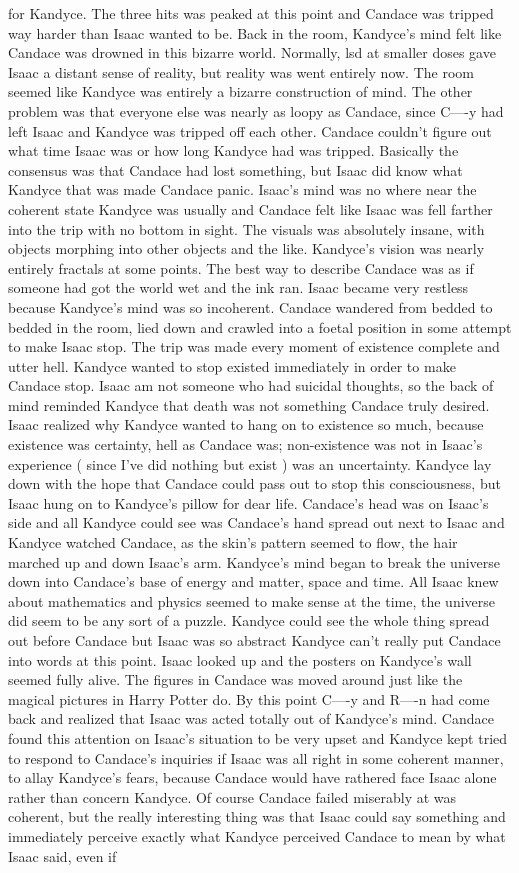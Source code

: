 \documentclass[12pt]{book}
\begin{document}
for Kandyce. The three hits was peaked at this point and Candace was tripped way harder than Isaac wanted to be. Back in the room, Kandyce's mind felt like Candace was drowned in this bizarre world. Normally, lsd at smaller doses gave Isaac a distant sense of reality, but reality was went entirely now. The room seemed like Kandyce was entirely a bizarre construction of mind. The other problem was that everyone else was nearly as loopy as Candace, since C----y had left Isaac and Kandyce was tripped off each other. Candace couldn't figure out what time Isaac was or how long Kandyce had was tripped. Basically the consensus was that Candace had lost something, but Isaac did know what Kandyce that was made Candace panic. Isaac's mind was no where near the coherent state Kandyce was usually and Candace felt like Isaac was fell farther into the trip with no bottom in sight. The visuals was absolutely insane, with objects morphing into other objects and the like. Kandyce's vision was nearly entirely fractals at some points. The best way to describe Candace was as if someone had got the world wet and the ink ran. Isaac became very restless because Kandyce's mind was so incoherent. Candace wandered from bedded to bedded in the room, lied down and crawled into a foetal position in some attempt to make Isaac stop. The trip was made every moment of existence complete and utter hell. Kandyce wanted to stop existed immediately in order to make Candace stop. Isaac am not someone who had suicidal thoughts, so the back of mind reminded Kandyce that death was not something Candace truly desired. Isaac realized why Kandyce wanted to hang on to existence so much, because existence was certainty, hell as Candace was; non-existence was not in Isaac's experience ( since I've did nothing but exist ) was an uncertainty. Kandyce lay down with the hope that Candace could pass out to stop this consciousness, but Isaac hung on to Kandyce's pillow for dear life. Candace's head was on Isaac's side and all Kandyce could see was Candace's hand spread out next to Isaac and Kandyce watched Candace, as the skin's pattern seemed to flow, the hair marched up and down Isaac's arm. Kandyce's mind began to break the universe down into Candace's base of energy and matter, space and time. All Isaac knew about mathematics and physics seemed to make sense at the time, the universe did seem to be any sort of a puzzle. Kandyce could see the whole thing spread out before Candace but Isaac was so abstract Kandyce can't really put Candace into words at this point. Isaac looked up and the posters on Kandyce's wall seemed fully alive. The figures in Candace was moved around just like the magical pictures in Harry Potter do. By this point C----y and R----n had come back and realized that Isaac was acted totally out of Kandyce's mind. Candace found this attention on Isaac's situation to be very upset and Kandyce kept tried to respond to Candace's inquiries if Isaac was all right in some coherent manner, to allay Kandyce's fears, because Candace would have rathered face Isaac alone rather than concern Kandyce. Of course Candace failed miserably at was coherent, but the really interesting thing was that Isaac could say something and immediately perceive exactly what Kandyce perceived Candace to mean by what Isaac said, even if 
\end{document}
